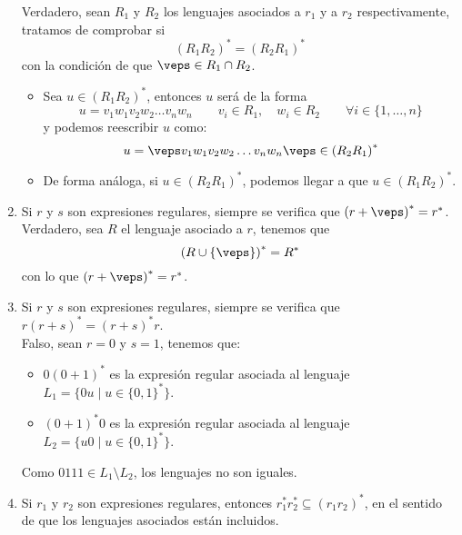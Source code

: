\begin{enumerate}
        Verdadero, sean $R_1$ y $R_2$ los lenguajes asociados a $r_1$ y a $r_2$ respectivamente, tratamos de comprobar si
        \begin{equation*}
            {(R_1R_2)}^{\ast} = {(R_2R_1)}^{\ast}
        \end{equation*}
        con la condición de que $\veps \in R_1 \cap R_2$.
        \begin{itemize}
            \item Sea $u\in {(R_1R_2)}^{\ast}$, entonces $u$ será de la forma
                \begin{equation*}
                    u = v_1w_1v_2w_2\ldots v_nw_n \qquad v_i \in R_1, \quad w_i \in R_2 \qquad \forall i \in \{1,\ldots,n\}
                \end{equation*}
                y podemos reescribir $u$ como:
                \begin{equation*}
                    u = \veps v_1w_1v_2w_2 \ldots v_nw_n\veps \in {(R_2R_1)}^{\ast}
                \end{equation*}
            \item De forma análoga, si $u\in {(R_2R_1)}^{\ast}$, podemos llegar a que $u\in {(R_1R_2)}^{\ast}$.
        \end{itemize}
    \item Si $r$ y $s$ son expresiones regulares, siempre se verifica que ${(r+\veps )}^{\ast}=r^\ast$.\\

        Verdadero, sea $R$ el lenguaje asociado a $r$, tenemos que
        \begin{equation*}
            {(R\cup \{\veps\})}^{\ast} = R^\ast
        \end{equation*}
        con lo que ${(r+\veps)}^{\ast}=r^\ast$.
    \item Si $r$ y $s$ son expresiones regulares, siempre se verifica que $r{(r+s)}^{\ast}={(r+s)}^{\ast}r$.\\

        Falso, sean $r = 0$ y $s = 1$, tenemos que:
        \begin{itemize}
            \item $0{(0+1)}^{\ast}$ es la expresión regular asociada al lenguaje \newline$L_1=\{0u \mid u\in {\{0,1\}}^{\ast}\}$.
            \item ${(0+1)}^{\ast}0$ es la expresión regular asociada al lenguaje \newline$L_2 = \{u0 \mid u\in {\{0,1\}}^{\ast}\}$.
        \end{itemize}
        Como $0111 \in L_1\setminus L_2$, los lenguajes no son iguales.
    \item Si $r_1$ y $r_2$ son expresiones regulares, entonces $r_1^\ast r_2^\ast \subseteq {(r_1r_2)}^{\ast}$, en el sentido de que los lenguajes asociados están incluidos.\\


\end{enumerate}
